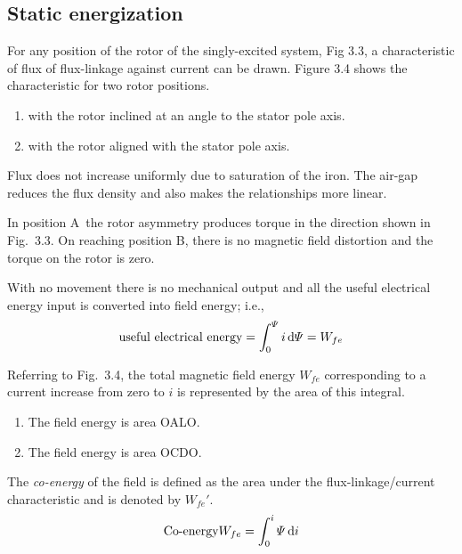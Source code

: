 \documentclass[a4paper,numbers=noenddot,12pt]{scrbook}
\begin{document}
            \subsection{Static energization}
            For any position of the rotor of the singly-excited system, Fig 3.3, a characteristic of flux of flux-linkage against current can be drawn. Figure 3.4 shows the characteristic for two rotor positions.
            \begin{enumerate}[label={Position \Alph*:},leftmargin=3cm]
                \item with the rotor inclined at an angle to the stator pole axis.
                \item with the rotor aligned with the stator pole axis.
            \end{enumerate}

            Flux does not increase uniformly due to saturation of the iron. The air-gap reduces the flux density and also makes the relationships more linear.

            In position A\ the rotor asymmetry produces torque in the direction shown in Fig.\ 3.3. On reaching position B, there is no magnetic field distortion and the torque on the rotor is zero.

            With no movement there is no mechanical output and all the useful electrical energy input is converted into field energy; i.e.,
            \begin{equation}
                \text{useful electrical energy} = \int_0^{\varPsi} i \dif \varPsi = W_{fe}
                \label{eq:Eq3.13}
            \end{equation}

            Referring to Fig.\ 3.4, the total magnetic field energy $W_{fe}$ corresponding to a current increase from zero to $i$ is represented by the area of this integral.
            \begin{enumerate}[label={Position \Alph*:},leftmargin=3cm]
                \item The field energy is area OALO.\@
                \item The field energy is area OCDO.\@
            \end{enumerate}

            The \textit{co-energy} of the field is defined as the area under the flux-linkage/current characteristic and is denoted by $W_{fe}'$.
            \begin{equation}
                \text{Co-energy} W_{fe} = \int_0^i \varPsi \dif i
                \label{eq:Eq3.14}
            \end{equation}
\end{document}
